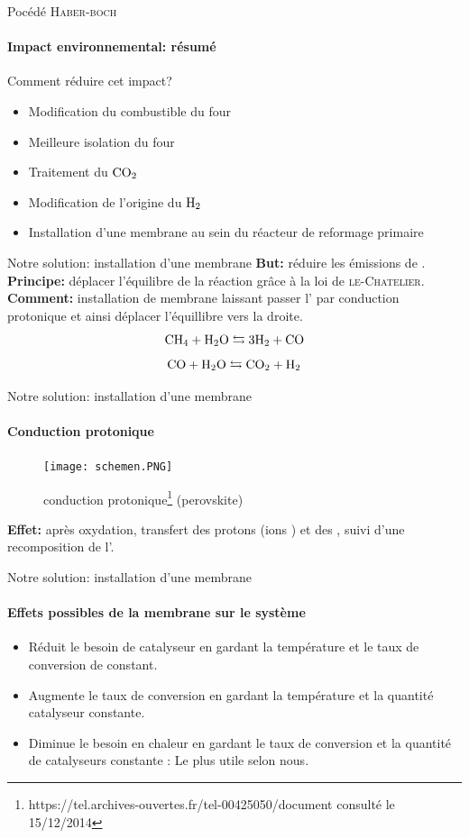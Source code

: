 \documentclass{beamer}
\begin{document}
\begin{frame}{Pocédé \textsc{Haber-boch}}
\framesubtitle{Impact environnemental: résumé}
\end{frame}


\begin{frame}{Comment réduire cet impact?}
\begin{itemize}
\item {Modification du combustible du four}
\item {Meilleure isolation du four}
\item {Traitement du $\ce{CO_2}$}
\item {Modification de l'origine du $\ce{H_2}$}
\item {Installation d'une membrane au sein du réacteur de reformage primaire}
\end{itemize}
\end{frame}

\begin{frame}{Notre solution: installation d'une membrane}
\textbf{But:} réduire les émissions de . \\
\textbf{Principe:} déplacer l'équilibre de la réaction grâce à la loi de \textsc{le-Chatelier}.
\\\textbf{Comment:} installation de membrane laissant passer l' par conduction protonique et ainsi déplacer l'équillibre vers la droite.
$$\ce{CH_4} + \ce{H_2O} \leftrightarrows 3\ce{H_2}+\ce{CO}$$
$$\ce{CO}+\ce{H_2O} \leftrightarrows \ce{CO_2}+\ce{H_2}$$
\end{frame}

\begin{frame}{Notre solution: installation d'une membrane}
\framesubtitle{Conduction protonique}
\begin{figure}[ht!]
 \centering
 \texttt{[image: schemen.PNG]}
 \caption{conduction protonique\footnote{https://tel.archives-ouvertes.fr/tel-00425050/document consulté le 15/12/2014} (perovskite)}
\end{figure}
\textbf{Effet:} après oxydation, transfert des protons (ions ) et des , suivi d'une recomposition de l'.
\end{frame}

\begin{frame}{Notre solution: installation d'une membrane}
\framesubtitle{Effets possibles de la membrane sur le système}
\begin{itemize}
\item Réduit le besoin de catalyseur en gardant la température et le taux de conversion de  constant.
\item Augmente le taux de conversion en gardant la température et la quantité catalyseur constante.
\item Diminue le besoin en chaleur en gardant le taux de conversion et la quantité de catalyseurs constante : Le plus utile selon nous.
\end{itemize}
\end{frame}
\end{document}
